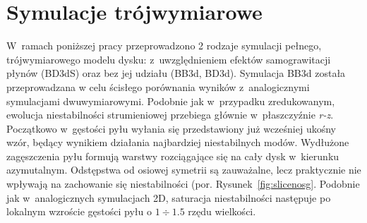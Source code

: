 \section{Symulacje trójwymiarowe}
W~ramach poniższej pracy przeprowadzono 2 rodzaje symulacji pełnego,
trójwymiarowego modelu dysku: z~uwzględnieniem efektów samograwitacji płynów
(BD3dS) oraz bez jej udziału (BB3d, BD3d). Symulacja BB3d została przeprowadzana
w celu ścisłego porównania wyników z~analogicznymi symulacjami dwuwymiarowymi.
Podobnie jak w~przypadku zredukowanym, ewolucja niestabilności strumieniowej
przebiega głównie w~płaszczyźnie \textit{r-z}. Początkowo w~gęstości pyłu
wyłania się przedstawiony już wcześniej ukośny wzór, będący wynikiem działania
najbardziej niestabilnych modów. Wydłużone zagęszczenia pyłu formują warstwy
rozciągające się na cały dysk w~kierunku azymutalnym. Odstępstwa od osiowej
symetrii są zauważalne, lecz praktycznie nie wpływają na zachowanie się
niestabilności (por. Rysunek~\ref{fig:slicenosg}. Podobnie jak w~analogicznych
symulacjach 2D, saturacja niestabilności następuje po lokalnym wzroście gęstości
pyłu o $1\div1.5$ rzędu wielkości.
%
